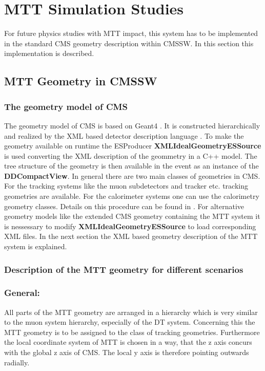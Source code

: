 \section{MTT Simulation Studies}
	For future physics studies with MTT impact, this system has to be implemented in the standard CMS geometry description within CMSSW.
	In this section this implementation is described. 
	\subsection{MTT Geometry in CMSSW}
		\subsubsection{The geometry model of CMS}
			The geometry model of CMS is based on Geant4 \cite{Geant4}.
			It is constructed hierarchically and realized by the XML based detector description language \cite{CMSDDL}.
			To make the geometry available on runtime the ESProducer \textbf{XMLIdealGeometryESSource} is used converting the XML description of the geommetry in a C++ model.
			The tree structure of the geometry is then available in the event as an instance of the \textbf{DDCompactView}.
			In general there are two main classes of geometries in CMS.
			For the tracking systems like the muon subdetectors and tracker etc. tracking geometries are available.
			For the calorimeter systems one can use the calorimetry geometry classes.
			Details on this procedure can be found in \cite{CMSDDL}.
			For alternative geometry models like the extended CMS geometry containing the MTT system it is nessessary to modify \textbf{XMLIdealGeometryESSource} to load corresponding XML files.
			In the next section the XML based geometry description of the MTT system is explained.
		\subsubsection{Description of the MTT geometry for different scenarios}
			\subsubsection*{General:}
			All parts of the MTT geometry are arranged in a hierarchy which is very similar to the muon system hierarchy, especially of the DT system.
			Concerning this the MTT geometry is to be assigned to the class of tracking geometries.
			Furthermore the local coordinate system of MTT is chosen in a way, that the z axis concurs with the global z axis of CMS.
			The local y axis is therefore pointing outwards radially.
